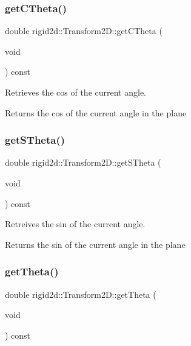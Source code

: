 \subsubsection{\texorpdfstring{get\+C\+Theta()}{getCTheta()}}
{\footnotesize\ttfamily double rigid2d\+::\+Transform2\+D\+::get\+C\+Theta (\begin{DoxyParamCaption}\item[{void}]{ }\end{DoxyParamCaption}) const}



Retrieves the cos of the current angle. 

\begin{DoxyReturn}{Returns}
the cos of the current angle in the plane 
\end{DoxyReturn}
\mbox{\label{classrigid2d_1_1Transform2D_a980917a1d86f290bd931dfa3eb78144f}} 
\subsubsection{\texorpdfstring{get\+S\+Theta()}{getSTheta()}}
{\footnotesize\ttfamily double rigid2d\+::\+Transform2\+D\+::get\+S\+Theta (\begin{DoxyParamCaption}\item[{void}]{ }\end{DoxyParamCaption}) const}



Retreives the sin of the current angle. 

\begin{DoxyReturn}{Returns}
the sin of the current angle in the plane 
\end{DoxyReturn}
\mbox{\label{classrigid2d_1_1Transform2D_aa380770351c67c0cd4410ceeb82b7c0d}} 
\subsubsection{\texorpdfstring{get\+Theta()}{getTheta()}}
{\footnotesize\ttfamily double rigid2d\+::\+Transform2\+D\+::get\+Theta (\begin{DoxyParamCaption}\item[{void}]{ }\end{DoxyParamCaption}) const}



